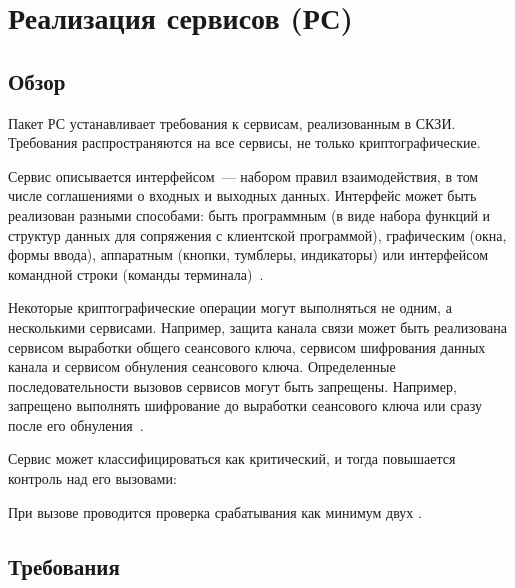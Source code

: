 \section{Реализация сервисов (РС)}\label{SV}

\subsection{Обзор}\label{SV.Intro}

Пакет РС устанавливает требования к сервисам, реализованным в СКЗИ.
%
Требования распространяются на все сервисы, не только криптографические.

Сервис описывается интерфейсом~--- набором правил взаимодействия,
в том числе соглашениями о входных и выходных данных.
%
Интерфейс может быть реализован разными способами:
%
быть программным (в виде набора функций и структур данных для сопряжения
с клиентской программой), графическим (окна, формы ввода),
аппаратным (кнопки, тумблеры, индикаторы)
или интерфейсом командной строки (команды терминала)~.

Некоторые криптографические операции могут выполняться не одним, а несколькими
сервисами. Например, защита канала связи может быть реализована сервисом
выработки общего сеансового ключа, сервисом шифрования данных канала и сервисом
обнуления сеансового ключа.
%
Определенные последовательности вызовов сервисов могут быть запрещены. Например,
запрещено выполнять шифрование до выработки сеансового ключа или сразу после его
обнуления~.

Сервис может классифицироваться как критический, и тогда повышается контроль над
его вызовами:  

При вызове  проводится проверка срабатывания как 
минимум двух . 

\subsection{Требования}\label{SV.Reqs}

